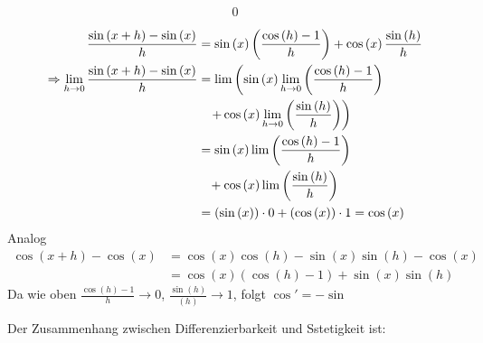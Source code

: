 \begin{enumerate}
\begin{align*}
{{{\begin{array}{*{20}{c}}
0
\end{array}} }}
\end{align*}
\begin{align*}
\frac{{\sin \left( {x + h} \right) - \sin \left( x \right)}}{h} &= \sin \left( x \right)\left( {\frac{{\cos \left( h \right) - 1}}{h}} \right) + \cos \left( x \right)\frac{{\sin \left( h \right)}}{h}\\
 \Rightarrow \mathop {\lim }\limits_{h \to 0} \frac{{\sin \left( {x + h} \right) - \sin \left( x \right)}}{h} &= \lim \left( {\sin \left( x \right)\mathop {\lim }\limits_{h \to 0} \left( {\frac{{\cos \left( h \right) - 1}}{h}} \right)} \right.\\
&\left. { \hspace{3mm}+ \cos \left( x \right)\mathop {\lim }\limits_{h \to 0} \left( {\frac{{\sin \left( h \right)}}{h}} \right)} \right)\\
 &= \sin \left( x \right)\lim \left( {\frac{{\cos \left( h \right) - 1}}{h}} \right)\\
 &\hspace{3mm}+ \cos \left( x \right)\lim \left( {\frac{{\sin \left( h \right)}}{h}} \right)\\
& = \left( {\sin \left( x \right)} \right) \cdot 0 + \left( {\cos \left( x \right)} \right) \cdot 1 = \cos \left( x \right)
\end{align*}
Analog
\begin{align*}
\cos \left( {x + h} \right) - \cos \left( x \right) &= \cos \left( x \right)\cos \left( h \right) - \sin \left( x \right)\sin \left( h \right) - \cos \left( x \right)\\
& = \cos \left( x \right)\left( {\cos \left( h \right) - 1} \right) + \sin \left( x \right)\sin \left( h \right)
\end{align*}
Da wie oben $\frac{{\cos \left( h \right) - 1}}{h} \to 0$, $\frac{{\sin \left( h \right)}}{{\left( h \right)}} \to 1$, folgt $\cos'=-\sin$
\end{enumerate}
Der Zusammenhang zwischen Differenzierbarkeit und Sstetigkeit ist:
